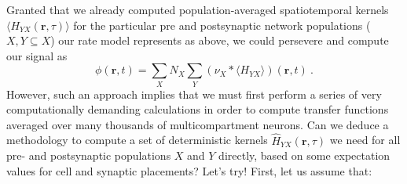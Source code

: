 Granted that we already computed population-averaged spatiotemporal kernels $\langle H_{YX} (\mathbf{r}, \tau) \rangle$ for the particular pre and postsynaptic network populations ($X, Y \subseteq X$) our rate model represents as above,
we could persevere and compute our signal as
\begin{equation}
\phi(\mathbf{r}, t) = \sum_X N_X \sum_Y \left( \nu_X \ast \langle H_{YX} \rangle \right)(\mathbf{r}, t) ~.
\end{equation}
However, such an approach implies that we must first perform a series of very computationally demanding calculations
in order to compute transfer functions averaged over many thousands of multicompartment neurons.
Can we deduce a methodology to compute a set of deterministic kernels $\hat{H}_{YX}(\mathbf{r}, \tau)$ we need for all pre- and postsynaptic populations $X$ and $Y$ directly,
based on some expectation values for cell and synaptic placements?
Let's try!
First, let us assume that:
